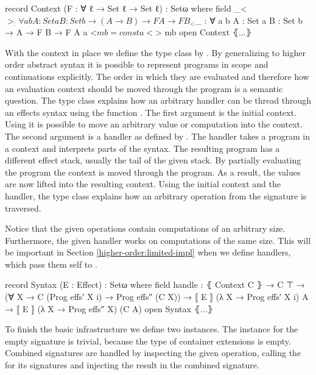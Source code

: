 \begin{code}
record Context (F : ∀ {ℓ} → Set ℓ → Set ℓ) : Setω where
  field _<$>_ : ∀ {a b} {A : Set a} {B : Set b} → (A → B) → F A → F B
  _<$_ : ∀ {a b} {A : Set a} {B : Set b} → A → F B → F A
  a <$ mb = const a <$> mb
open Context ⦃...⦄
\end{code}
With the context in place we define the  type class by
\citeauthor{DBLP:conf/haskell/WuSH14}.
By generalizing to higher order abstract syntax it is possible to represent
programs in scope and continuations explicitly.
The order in which they are evaluated and therefore how an evaluation context
should be moved through the program is a semantic question.
The type class explains how an arbitrary handler can be thread through an
effects syntax using the function .
The first argument is the initial context.
Using \AgdaFunction{<\$} it is possible to move an arbitrary value or
computation into the context.
The second argument is a handler as defined by
\citeauthor{DBLP:conf/haskell/WuSH14}.
The handler takes a program in a context and interprets parts of the syntax.
The resulting program has a different effect stack, usually the tail of the
given stack.
By partially evaluating the program the context is moved through the
program.
As a result, the values are now lifted into the resulting context.
Using the initial context and the handler, the type class explains how an
arbitrary operation from the signature  is traversed.

Notice that the given operations contain computations of an arbitrary size.
Furthermore, the given handler works on computations of the same size.
This will be important in Section \ref{higher-order:limited-impl} when we define
handlers, which pass them self to .

\begin{code}
record Syntax (E : Effect) : Setω where
  field handle : ⦃ Context C ⦄ → C ⊤ →
          (∀ {X} → C (Prog effs′ X {i}) → Prog effs″ (C X)) →
          ⟦ E ⟧ (λ X → Prog effs′ X {i}) A → ⟦ E ⟧ (λ X → Prog effs″ X) (C A)
open Syntax ⦃...⦄
\end{code}
To finish the basic infrastructure we define two 
instances.
The instance for the empty signature  is trivial, because the
type of container extensions is empty.
Combined signatures are handled by inspecting the given operation, calling the
 for its signatures and injecting the result in the
combined signature.

